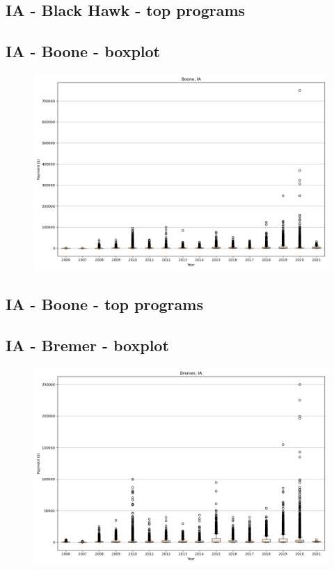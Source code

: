 \subsection*{IA - Black Hawk - top programs}

\newpage
\subsection*{IA - Boone - boxplot}
\begin{figure}[h]
\centering
\includegraphics[width=7in]{../output/boxplots/counties/Boone-IA_boxplot.png}
\end{figure}


\subsection*{IA - Boone - top programs}

\newpage
\subsection*{IA - Bremer - boxplot}
\begin{figure}[h]
\centering
\includegraphics[width=7in]{../output/boxplots/counties/Bremer-IA_boxplot.png}
\end{figure}



